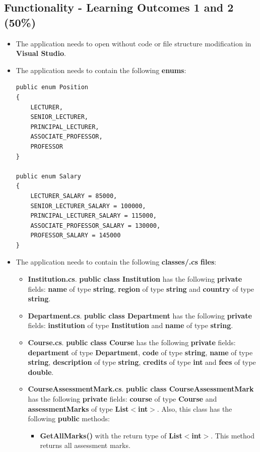 \documentclass{article}
\begin{document}
\subsection*{Functionality - Learning Outcomes 1 and 2 (50\%)}
\begin{itemize}
    \item The application needs to open without code or file structure modification in \textbf{Visual Studio}.
    \item The application needs to contain the following \textbf{enums}:
    \begin{verbatim}
public enum Position
{
    LECTURER,
    SENIOR_LECTURER,
    PRINCIPAL_LECTURER,
    ASSOCIATE_PROFESSOR,
    PROFESSOR
}
            
public enum Salary
{
    LECTURER_SALARY = 85000,
    SENIOR_LECTURER_SALARY = 100000,
    PRINCIPAL_LECTURER_SALARY = 115000,
    ASSOCIATE_PROFESSOR_SALARY = 130000,
    PROFESSOR_SALARY = 145000
}
    \end{verbatim}
    \item The application needs to contain the following \textbf{classes/.cs files}:
    \begin{itemize}
        \item \textbf{Institution.cs}. \textbf{public class Institution} has the following \textbf{private} fields: \textbf{name} of type \textbf{string}, \textbf{region} of type \textbf{string} and \textbf{country} of type \textbf{string}. 
        \item \textbf{Department.cs}. \textbf{public class Department} has the following \textbf{private} fields: \textbf{institution} of type \textbf{Institution} and \textbf{name} of type \textbf{string}.
        \item \textbf{Course.cs}. \textbf{public class Course} has the following \textbf{private} fields: \textbf{department} of type \textbf{Department}, \textbf{code} of type \textbf{string}, \textbf{name} of type \textbf{string}, \textbf{description} of type \textbf{string}, \textbf{credits} of type \textbf{int} and \textbf{fees} of type \textbf{double}.
        \item \textbf{CourseAssessmentMark.cs}. \textbf{public class CourseAssessmentMark} has the following \textbf{private} fields: \textbf{course} of type \textbf{Course} and \textbf{assessmentMarks} of type \textbf{List$<$int$>$}. Also, this class has the following \textbf{public} methods:
        \begin{itemize}
            \item \textbf{GetAllMarks()} with the return type of \textbf{List$<$int$>$}. This method returns all assessment marks.

\end{itemize}
\end{itemize}
\end{itemize}
\end{document}
